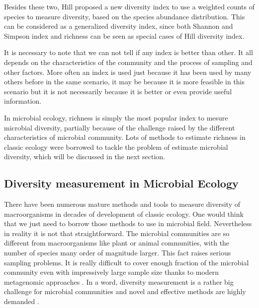 Besides these two, Hill \cite{hill1973diversity} proposed a new diversity index to use a weighted counts of species to measure 
diversity, based on the species abundance distribution. This can be considered as a generalized diversity index, 
since both Shannon and Simpson index and richness can be seen as special cases of Hill diversity index.

It is necessary to note that we can not tell if any index is better than other. It all depends on the characteristics
of the community and the process of sampling and other factors. More often an index is used just because it has
been used by many others before in the same scenario, it may be because it is more feasible in this scenario 
but it is not necessarily because it is better or even provide useful information.

In microbial ecology, richness is simply the most popular index to mesure microbial diversity, partially because of 
the challenge raised by the different characteristics of microbial community. Lots of methods to estimate richness in classic 
ecology were borrowed to tackle the problem of estimate microbial diversity, which will be discussed in the next section.

\subsection{Diversity measurement in Microbial Ecology}

There have been numerous mature methods and tools to measure diversity of macroorganisms 
in decades of development of classic ecology. One would think that we just need to borrow 
those methods to use in microbial field. Nevertheless in reality it is not that straightforward. 
The microbial communities are so different from macroorganisms like plant or animal communities,
 with the number of species many order of magnitude larger\cite{Whitman:1998aa}.
This fact raises serious sampling problems. It is really difficult to cover enough fraction of the microbial community
 even with impressively large sample size thanks to modern metagenomic approaches \cite{Roesch:2007aa}.
In a word, diversity measurement is a rather big challenge for microbial communities and novel 
and effective methods are highly demanded \cite{Schloss:2005aa}.

